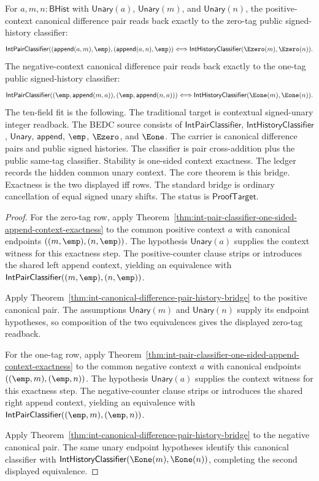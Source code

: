 \begin{theorem}
\label{thm:int-contextual-canonical-pair-history-bridge}
For $a,m,n:\mathsf{BHist}$ with $\mathsf{Unary}(a)$,
$\mathsf{Unary}(m)$, and $\mathsf{Unary}(n)$, the positive-context canonical
difference pair reads back exactly to the zero-tag public signed-history
classifier:
$$
\mathsf{IntPairClassifier}((\mathsf{append}(a,m),\emp),
(\mathsf{append}(a,n),\emp))
\Longleftrightarrow
\mathsf{IntHistoryClassifier}(\Ezero(m),\Ezero(n)).
$$
The negative-context canonical difference pair reads back exactly to the
one-tag public signed-history classifier:
$$
\mathsf{IntPairClassifier}((\emp,\mathsf{append}(m,a)),
(\emp,\mathsf{append}(n,a)))
\Longleftrightarrow
\mathsf{IntHistoryClassifier}(\Eone(m),\Eone(n)).
$$
The ten-field fit is the following. The traditional target is contextual
signed-unary integer readback. The BEDC source consists of
$\mathsf{IntPairClassifier}$, $\mathsf{IntHistoryClassifier}$,
$\mathsf{Unary}$, $\mathsf{append}$, $\emp$, $\Ezero$, and $\Eone$. The
carrier is canonical difference pairs and public signed histories. The
classifier is pair cross-addition plus the public same-tag classifier.
Stability is one-sided context exactness. The ledger records the hidden common
unary context. The core theorem is this bridge. Exactness is the two displayed
iff rows. The standard bridge is ordinary cancellation of equal signed unary
shifts. The status is $\mathsf{ProofTarget}$.
\end{theorem}
\begin{proof}
For the zero-tag row, apply
Theorem~\ref{thm:int-pair-classifier-one-sided-append-context-exactness} to
the common positive context $a$ with canonical endpoints
$((m,\emp),(n,\emp))$. The hypothesis $\mathsf{Unary}(a)$ supplies the context
witness for this exactness step. The positive-counter clause strips or
introduces the shared left append context, yielding an equivalence with
$\mathsf{IntPairClassifier}((m,\emp),(n,\emp))$.

Apply Theorem~\ref{thm:int-canonical-difference-pair-history-bridge} to the
positive canonical pair. The assumptions $\mathsf{Unary}(m)$ and
$\mathsf{Unary}(n)$ supply its endpoint hypotheses, so composition of the two
equivalences gives the displayed zero-tag readback.

For the one-tag row, apply
Theorem~\ref{thm:int-pair-classifier-one-sided-append-context-exactness} to
the common negative context $a$ with canonical endpoints
$((\emp,m),(\emp,n))$. The hypothesis $\mathsf{Unary}(a)$ supplies the context
witness for this exactness step. The negative-counter clause strips or
introduces the shared right append context, yielding an equivalence with
$\mathsf{IntPairClassifier}((\emp,m),(\emp,n))$.

Apply Theorem~\ref{thm:int-canonical-difference-pair-history-bridge} to the
negative canonical pair. The same unary endpoint hypotheses identify this
canonical classifier with
$\mathsf{IntHistoryClassifier}(\Eone(m),\Eone(n))$, completing the second
displayed equivalence.
\end{proof}

